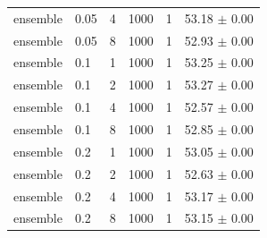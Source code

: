 \begin{longtable}{llcccc}
ensemble & 0.05 & 4 & 1000 & 1 & 53.18 $\pm$ 0.00 \\
ensemble & 0.05 & 8 & 1000 & 1 & 52.93 $\pm$ 0.00 \\
ensemble & 0.1 & 1 & 1000 & 1 & 53.25 $\pm$ 0.00 \\
ensemble & 0.1 & 2 & 1000 & 1 & 53.27 $\pm$ 0.00 \\
ensemble & 0.1 & 4 & 1000 & 1 & 52.57 $\pm$ 0.00 \\
ensemble & 0.1 & 8 & 1000 & 1 & 52.85 $\pm$ 0.00 \\
ensemble & 0.2 & 1 & 1000 & 1 & 53.05 $\pm$ 0.00 \\
ensemble & 0.2 & 2 & 1000 & 1 & 52.63 $\pm$ 0.00 \\
ensemble & 0.2 & 4 & 1000 & 1 & 53.17 $\pm$ 0.00 \\
ensemble & 0.2 & 8 & 1000 & 1 & 53.15 $\pm$ 0.00 \\
\end{longtable}
